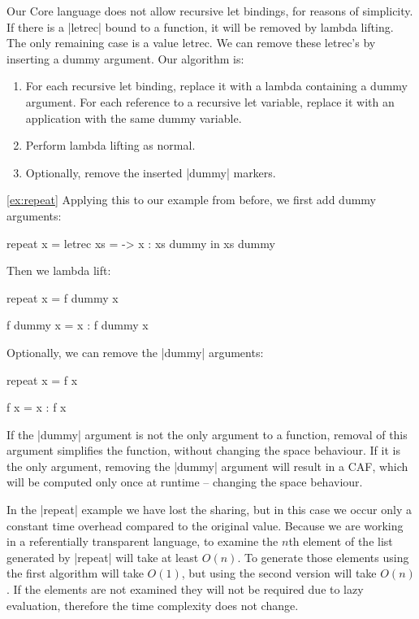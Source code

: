 Our Core language does not allow recursive let bindings, for reasons of simplicity. If there is a |letrec| bound to a function, it will be removed by lambda lifting. The only remaining case is a value letrec. We can remove these letrec's by inserting a dummy argument. Our algorithm is:

\begin{enumerate}
\item For each recursive let binding, replace it with a lambda containing a dummy argument. For each reference to a recursive let variable, replace it with an application with the same dummy variable.
\item Perform lambda lifting as normal.
\item Optionally, remove the inserted |dummy| markers.
\end{enumerate}

\begin{examplerevisit}{\ref{ex:repeat}}
Applying this to our example from before, we first add dummy arguments:

\begin{code}
repeat x =  letrec xs = \dummy ->  x : xs dummy
            in xs dummy
\end{code}

Then we lambda lift:

\begin{code}
repeat x = f dummy x

f dummy x = x : f dummy x
\end{code}

Optionally, we can remove the |dummy| arguments:

\begin{code}
repeat x = f x

f x = x : f x
\end{code}
\end{examplerevisit}

If the |dummy| argument is not the only argument to a function, removal of this argument simplifies the function, without changing the space behaviour. If it is the only argument, removing the |dummy| argument will result in a CAF, which will be computed only once at runtime -- changing the space behaviour.

In the |repeat| example we have lost the sharing, but in this case we occur only a constant time overhead compared to the original value. Because we are working in a referentially transparent language, to examine the $n$th element of the list generated by |repeat| will take at least $O(n)$. To generate those elements using the first algorithm will take $O(1)$, but using the second version will take $O(n)$. If the elements are not examined they will not be required due to lazy evaluation, therefore the time complexity does not change.

